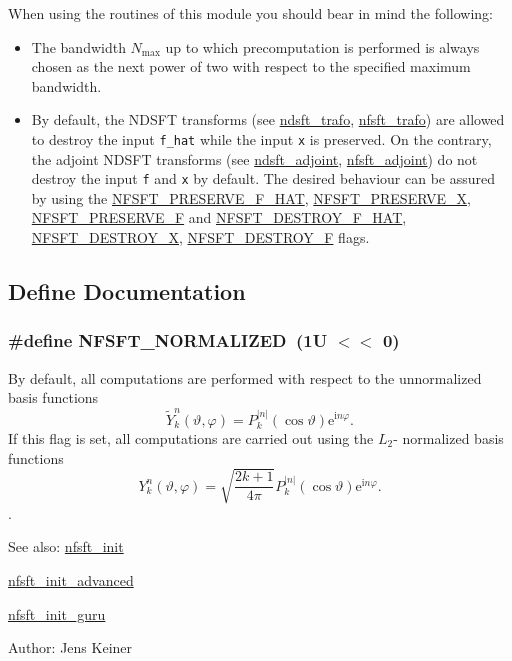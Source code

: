 When using the routines of this module you should bear in mind the following: \begin{itemize}
\item The bandwidth $N_{\text{max}}$ up to which precomputation is performed is always chosen as the next power of two with respect to the specified maximum bandwidth. \item By default, the NDSFT transforms (see \hyperlink{group__nfsft_ga6}{ndsft\_\-trafo}, \hyperlink{group__nfsft_ga8}{nfsft\_\-trafo}) are allowed to destroy the input {\tt f\_\-hat} while the input {\tt x} is preserved. On the contrary, the adjoint NDSFT transforms (see \hyperlink{group__nfsft_ga7}{ndsft\_\-adjoint}, \hyperlink{group__nfsft_ga9}{nfsft\_\-adjoint}) do not destroy the input {\tt f} and {\tt x} by default. The desired behaviour can be assured by using the \hyperlink{group__nfsft_ga31}{NFSFT\_\-PRESERVE\_\-F\_\-HAT}, \hyperlink{group__nfsft_ga32}{NFSFT\_\-PRESERVE\_\-X}, \hyperlink{group__nfsft_ga33}{NFSFT\_\-PRESERVE\_\-F} and \hyperlink{group__nfsft_ga34}{NFSFT\_\-DESTROY\_\-F\_\-HAT}, \hyperlink{group__nfsft_ga35}{NFSFT\_\-DESTROY\_\-X}, \hyperlink{group__nfsft_ga36}{NFSFT\_\-DESTROY\_\-F} flags. \end{itemize}


\subsection{Define Documentation}
\hypertarget{group__nfsft_ga25}{
\subsubsection[NFSFT\_\-NORMALIZED]{\setlength{\rightskip}{0pt plus 5cm}\#define NFSFT\_\-NORMALIZED~(1U $<$$<$ 0)}}
\label{group__nfsft_ga25}


By default, all computations are performed with respect to the unnormalized basis functions \[ \tilde{Y}_k^n(\vartheta,\varphi) = P_k^{|n|}(\cos\vartheta) \mathrm{e}^{\mathrm{i} n \varphi}. \] If this flag is set, all computations are carried out using the $L_2$- normalized basis functions \[ Y_k^n(\vartheta,\varphi) = \sqrt{\frac{2k+1}{4\pi}} P_k^{|n|}(\cos\vartheta) \mathrm{e}^{\mathrm{i} n \varphi}. \]. 

\begin{Desc}
\item[See also:]\hyperlink{group__nfsft_ga1}{nfsft\_\-init} 

\hyperlink{group__nfsft_ga2}{nfsft\_\-init\_\-advanced} 

\hyperlink{group__nfsft_ga3}{nfsft\_\-init\_\-guru} \end{Desc}
\begin{Desc}
\item[Author:]Jens Keiner \end{Desc}


